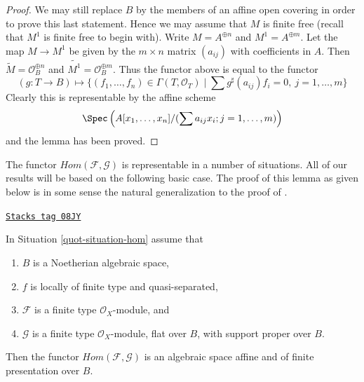 \begin{proof}
\medskip\noindent
We may still replace $B$ by the members of an affine open covering
in order to prove this last statement. Hence we may assume that $M$
is finite free (recall that $M^1$ is finite free to begin with).
Write $M = A^{\oplus n}$ and $M^1 = A^{\oplus m}$. Let the map
$M \to M^1$ be given by the $m \times n$ matrix $(a_{ij})$ with
coefficients in $A$. Then $\widetilde{M} = \mathcal{O}_B^{\oplus n}$
and $\widetilde{M^1} = \mathcal{O}_B^{\oplus m}$. Thus the functor
above is equal to the functor
$$
(g : T \to B) \longmapsto
\{(f_1, \ldots, f_n) \in \Gamma(T, \mathcal{O}_T) \mid
\sum g^\sharp(a_{ij})f_i = 0,\ j = 1, \ldots, m\}
$$
Clearly this is representable by the affine scheme
$$
\Spec\left(A[x_1, \ldots, x_n]/(\sum a_{ij}x_i; j = 1, \ldots, m)\right)
$$
and the lemma has been proved.
\end{proof}

The functor $\mathit{Hom}(\mathcal{F}, \mathcal{G})$ is representable in a
number of situations. All of our results will be based on the following
basic case. The proof of this lemma as given below is in some sense the
natural generalization to the proof of \cite[III, Cor 7.7.8]{EGA}.

\begin{lemma}
\label{quot-lemma-noetherian-hom}
\href{https://stacks.math.columbia.edu/tag/08JY}{\texttt{Stacks tag 08JY}}

In Situation \ref{quot-situation-hom} assume that
\begin{enumerate}
\item $B$ is a Noetherian algebraic space,
\item $f$ is locally of finite type and quasi-separated,
\item $\mathcal{F}$ is a finite type $\mathcal{O}_X$-module, and
\item $\mathcal{G}$ is a finite type $\mathcal{O}_X$-module, flat over $B$,
with support proper over $B$.
\end{enumerate}
Then the functor $\mathit{Hom}(\mathcal{F}, \mathcal{G})$ is
an algebraic space affine and of finite presentation over $B$.
\end{lemma}

